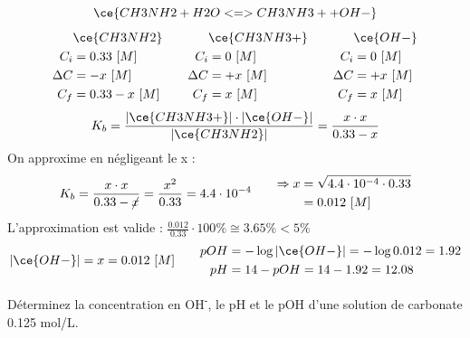 \documentclass[
  11pt,
  french,
  a4paper,
  openany]{book}
\begin{document}
\begin{Answer}
\[
\ce{CH3NH2 + H2O <=> CH3NH3+ + OH-}
\]
\[
\begin{split}
&\ce{CH3NH2}\\
C_i &= 0.33\ [M] \\
\Delta C &= - x\ [M] \\
C_f &= 0.33 - x\ [M] \\
\end{split}
\qquad
\begin{split}
&\ce{CH3NH3+}\\
C_i &= 0\ [M] \\
\Delta C &= + x\ [M] \\
C_f &= x\ [M] \\
\end{split}
\qquad
\begin{split}
&\ce{OH-}\\
C_i &= 0\ [M] \\
\Delta C &= + x\ [M] \\
C_f &= x\ [M] \\
\end{split}
\]
\[
K_b = \frac{|\ce{CH3NH3+}| \cdot |\ce{OH-}|}{|\ce{CH3NH2}|} = \frac{x \cdot x}{0.33 - x}
\]
On approxime en négligeant le x :
\[
\begin{split}
K_b = \frac{x \cdot x}{0.33 - \cancel{x}} = \frac{x^2}{0.33} = 4.4 \cdot 10^{-4}
\end{split}
\qquad
\begin{split}
\Rightarrow x &= \sqrt{4.4 \cdot 10^{-4} \cdot 0.33} \\
  &= 0.012\ [M]
\end{split}
\]
L'approximation est valide : \(\frac{0.012}{0.33} \cdot 100\% \cong 3.65\% < 5\%\)
\[
\begin{split}
|\ce{OH-}| = x = 0.012\ [M] 
\end{split}
\qquad
\begin{split}
pOH &= - \log |\ce{OH-}| = - \log 0.012 = 1.92 \\
pH &= 14 - pOH = 14 - 1.92 = 12.08
\end{split}
\]

\end{Answer}

\begin{Exercise}
Déterminez la concentration en OH\textsuperscript{-}, le pH et le pOH d'une solution de carbonate 0.125 mol/L.

\end{Exercise}
\end{document}
